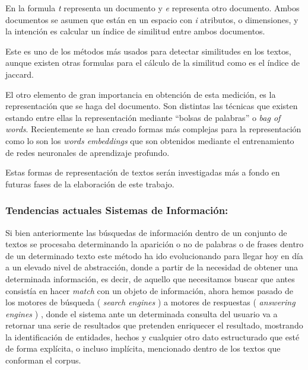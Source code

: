 \documentclass[
  10,
  openany]{book}
\begin{document}
En la formula \emph{t} representa un documento y \emph{e} representa otro documento. Ambos documentos se asumen que están en un espacio con \emph{i} atributos, o dimensiones, y la intención es calcular un índice de similitud entre ambos documentos.

Este es uno de los métodos más usados para detectar similitudes en los textos, aunque existen otras formulas para el cálculo de la similitud como es el índice de jaccard.

El otro elemento de gran importancia en obtención de esta medición, es la representación que se haga del documento. Son distintas las técnicas que existen estando entre ellas la representación mediante ``bolsas de palabras'' o \emph{bag of words}. Recientemente se han creado formas más complejas para la representación como lo son los \emph{words embeddings} que son obtenidos mediante el entrenamiento de redes neuronales de aprendizaje profundo.

Estas formas de representación de textos serán investigadas más a fondo en futuras fases de la elaboración de este trabajo.

\hypertarget{tendencias-actuales-sistemas-de-informaciuxf3n}{%
\subsubsection{Tendencias actuales Sistemas de Información:}\label{tendencias-actuales-sistemas-de-informaciuxf3n}}

Si bien anteriormente las búsquedas de información dentro de un conjunto de textos se procesaba determinando la aparición o no de palabras o de frases dentro de un determinado texto este método ha ido evolucionando para llegar hoy en día a un elevado nivel de abstracción, donde a partir de la necesidad de obtener una determinada información, es decir, de aquello que necesitamos buscar que antes consistía en hacer \emph{match} con un objeto de información, ahora hemos pasado de los motores de búsqueda ( \emph{search engines} ) a motores de respuestas ( \emph{answering engines} ) \citep{balog2018}, donde el sistema ante un determinada consulta del usuario va a retornar una serie de resultados que pretenden enriquecer el resultado, mostrando la identificación de entidades, hechos y cualquier otro dato estructurado que esté de forma explícita, o incluso implícita, mencionado dentro de los textos que conforman el corpus.
\end{document}
